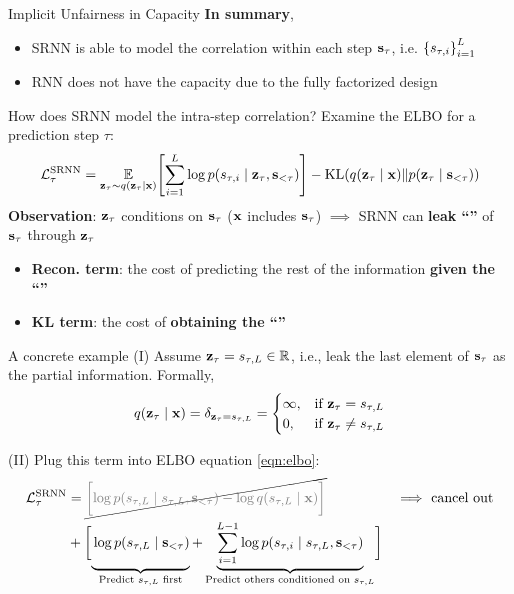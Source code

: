 \documentclass[final]{beamer}
\newlength{\colwidth}
\begin{document}
\begin{frame}[t]
\begin{columns}[t]
\begin{column}{\colwidth}
\begin{block}{Implicit Unfairness in Capacity}
 	\textbf{In summary},
 	\begin{itemize}
 	\item SRNN is able to model the correlation within each step ${\mathbf{s}}_\tau$, i.e. $\left\{ {s_{\tau,i}} \right\}_{i=1}^{L}$
 	\item RNN does not have the capacity due to the fully factorized design
 	\end{itemize}
\end{block}

\begin{block}{How does SRNN model the intra-step correlation?}
	Examine the ELBO for a prediction step $\tau$:
	\begin{equation}\label{eqn:elbo}
		\mc{L}^\text{SRNN}_\tau = \E_{\rvz_\tau \sim q(\rvz_{\tau} \mid \rvx)} \sbr{ \sum_{i=1}^{L} \log p(s_{\tau,i} \mid \rvz_\tau, \rvs_{<\tau}) } - \text{KL}\rbr{q(\rvz_{\tau} \mid \rvx) \| p(\rvz_{\tau} \mid \rvs_{<\tau})}
	\end{equation}
	\textbf{Observation}: ${\mathbf{z}}_{\tau}$ conditions on ${\mathbf{s}}_\tau$ (${\mathbf{x}}$ includes ${\mathbf{s}}_\tau$) $\implies$ SRNN can \textbf{leak ``''} of ${\mathbf{s}}_{\tau}$ through ${\mathbf{z}}_{\tau}$
	\begin{itemize}
		\item \textbf{Recon. term}: the cost of predicting the rest of the information \textbf{given the ``''}
		\item \textbf{KL term}: the cost of \textbf{obtaining the ``''}
	\end{itemize} 
\end{block}

\begin{alertblock}{A concrete example}
 	(I) Assume ${\mathbf{z}}_{\tau} = s_{\tau, L} \in \mathbb{R}$, i.e., leak the last element of ${\mathbf{s}}_{\tau}$ as the partial information. Formally,
 	\[ q({\mathbf{z}}_{\tau} \mid {\mathbf{x}}) = \delta_{{\mathbf{z}}_{\tau} = s_{\tau, L}} = 
 	\begin{cases}
 	\infty, & \text{if ${\mathbf{z}}_{\tau} = s_{\tau, L}$} \\
 	0, &\text{if ${\mathbf{z}}_{\tau} \neq s_{\tau, L}$} \\
 	\end{cases} 
 	\]
 	
 	(II) Plug this term into ELBO equation \eqref{eqn:elbo}:
 	\begin{align*}
 	\mc{L}^\text{SRNN}_\tau
 	&= \cancel{ \gray{ \sbr[\bigg]{ \log p(s_{\tau,L} \mid s_{\tau,L}, \rvs_{<\tau}) - \log q(s_{\tau,L} \mid \rvx) } } } && \text{$\implies$ cancel out} \\
 	&+ \sbr[\bigg]{ 
 		\underbrace{\vphantom{\sum_{i=1}^{L-1}} \log p(s_{\tau,L} \mid \rvs_{<\tau})}_\text{Predict $s_{\tau,L}$ first} + 
 		\underbrace{\sum_{i=1}^{L-1} \log p(s_{\tau,i} \mid s_{\tau,L}, \rvs_{<\tau}) }_\text{Predict others conditioned on $s_{\tau,L}$}}
 	\end{align*}
 	

\end{alertblock}
\end{column}
\end{columns}
\end{frame}
\end{document}
